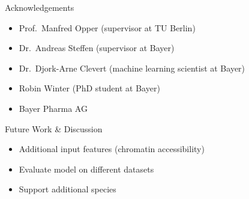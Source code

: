 \documentclass[Nike]{tuberlinbeamer}
\begin{document}
\begin{frame}{Acknowledgements}
  \begin{itemize}
    \item Prof.\ Manfred Opper (supervisor at TU Berlin)
    \item Dr.\ Andreas Steffen (supervisor at Bayer)
    \item Dr.\ Djork-Arne Clevert (machine learning scientist at Bayer)
    \item Robin Winter (PhD student at Bayer)
    \item Bayer Pharma AG
  \end{itemize}

\end{frame}

\begin{frame}{Future Work \& Discussion}
  \begin{itemize}
    \item Additional input features (chromatin accessibility)
    \item Evaluate model on different datasets
    \item Support additional species
  \end{itemize}
\end{frame}
\end{document}

